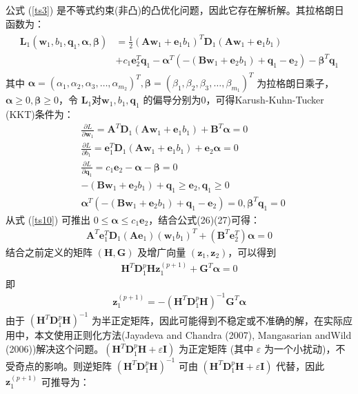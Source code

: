 公式 (\ref{ts3}) 是不等式约束(非凸)的凸优化问题，因此它存在解析解。其拉格朗日函数为：
\begin{align}
\begin{split}
	\pmb{L}_1(\mathbf{w}_1,b_1,\mathbf{q}_1,\pmb{\alpha},\pmb{\beta}) &=\frac{1}{2}(\mathbf{Aw}_1+\mathbf{e}_1b_1)^T\mathbf{D}_1(\mathbf{Aw}_1+\mathbf{e}_1b_1)\\
	&+c_1\mathbf{e}_2^T\mathbf{q}_1-\pmb{\alpha}^T(-(\mathbf{Bw}_1+\mathbf{e}_2b_1)+\mathbf{q}_1-\mathbf{e}_2)-\pmb{\beta}^T\mathbf{q}_1
\end{split}
\end{align}
其中 $\pmb{\alpha}=(\alpha_1,\alpha_2,\alpha_3,…,\alpha_{m_2})^T, \pmb{\beta}=(\beta_1,\beta_2,\beta_3,…,\beta_{m_1})^T$ 为拉格朗日乘子，$\pmb{\alpha}\geq 0,\pmb{\beta}\geq 0$，令 $\pmb{L}_1$对$\mathbf{w}_1,b_1,\mathbf{q}_1$ 的偏导分别为0，可得Karush-Kuhn-Tucker (KKT)条件为：
\begin{align}
	&\frac{\partial{L}}{\partial{\mathbf{w}_1}}=\mathbf{A}^T\mathbf{D}_1(\mathbf{Aw}_1+\mathbf{e}_1b_1)+\mathbf{B}^T\pmb{\alpha}=0\\
	&\frac{\partial{L}}{\partial{b_1}}=\mathbf{e}_1^T\mathbf{D}_1(\mathbf{Aw}_1+\mathbf{e}_1b_1)+\mathbf{e}_2\pmb{\alpha}=0\\
	\label{ts10}
	&\frac{\partial{L}}{\partial{\mathbf{q}_1}}=c_1\mathbf{e}_2-\pmb{\alpha}-\pmb{\beta}=0\\
	&-(\mathbf{Bw}_1+\mathbf{e}_2b_1)+\mathbf{q}_1 \geq \mathbf{e}_2, \mathbf{q}_1\geq 0\\
	&\pmb{\alpha}^T(-(\mathbf{Bw}_1+\mathbf{e}_2b_1)+\mathbf{q}_1-\mathbf{e}_2)=0,\pmb{\beta}^T\mathbf{q}_1=0
\end{align}
从式 (\ref{ts10}) 可推出 $0\le \pmb{\alpha} \le c_1\mathbf{e}_2$，结合公式(26)(27)可得：
\begin{align}
	\mathbf{A}^T\mathbf{e}_1^T\mathbf{D}_1(\mathbf{Ae}_1)(\mathbf{w}_1b_1)^T+(\mathbf{B}^T\mathbf{e}_2^T)\pmb{\alpha}=0
\end{align}
结合之前定义的矩阵 $(\mathbf{H,G})$ 及增广向量 $(\mathbf{z}_1,\mathbf{z}_2)$，可以得到
\begin{align}
	\mathbf{H}^T\mathbf{D}_1^p\mathbf{Hz}_1^{(p+1)}+\mathbf{G}^T\pmb{\alpha}=0
\end{align}
即
\begin{align}
\label{ts11}
	\mathbf{z}_1^{(p+1)}=-(\mathbf{H}^T\mathbf{D}_1^p\mathbf{H})^{-1}\mathbf{G}^T\pmb{\alpha}
\end{align}
由于 $(\mathbf{H}^T\mathbf{D}_1^p\mathbf{H})^{-1}$ 为半正定矩阵，因此可能得到不稳定或不准确的解，在实际应用中，本文使用正则化方法(Jayadeva and Chandra (2007), Mangasarian andWild (2006))解决这个问题。$(\mathbf{H}^T\mathbf{D}_1^p\mathbf{H}+\varepsilon \mathbf{I})$ 为正定矩阵 (其中 $\varepsilon$ 为一个小扰动)，不受奇点的影响。则逆矩阵 $(\mathbf{H}^T\mathbf{D}_1^p\mathbf{H})^{-1}$ 可由 $(\mathbf{H}^T\mathbf{D}_1^p\mathbf{H}+\varepsilon \mathbf{I})$ 代替，因此 $\mathbf{z}_1^{(p+1)}$ 可推导为：
